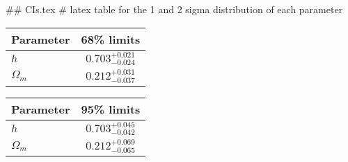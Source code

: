 ## CIs.tex
# latex table for the 1 and 2 sigma distribution of each parameter

\begin{tabular} { l  c}
 Parameter &  68\% limits\\
\hline
{\boldmath$h              $} & $0.703^{+0.021}_{-0.024}   $\\
{\boldmath$\Omega_m       $} & $0.212^{+0.031}_{-0.037}   $\\
\hline
\end{tabular}

\begin{tabular} { l  c}
 Parameter &  95\% limits\\
\hline
{\boldmath$h              $} & $0.703^{+0.045}_{-0.042}   $\\
{\boldmath$\Omega_m       $} & $0.212^{+0.069}_{-0.065}   $\\
\hline
\end{tabular}
